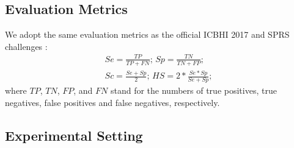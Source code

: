 \documentclass{article}
\begin{document}
\begin{sloppy}
\subsection{Evaluation Metrics}
\label{ssec:eval}

We adopt the same evaluation metrics as the official ICBHI 2017 and SPRS challenges :
\begin{equation}
\label{se}
\begin{split}
    Se=\frac{TP}{TP+FN};\,Sp=\frac{TN}{TN+FP}; \\ Sc=\frac{Se+Sp}{2};\, HS=2*\frac{Se*Sp}{Se+Sp};
\end{split}
\end{equation}
where $TP$, $TN$, $FP$, and $FN$ stand for the numbers of true positives, true negatives, false positives and false negatives, respectively.

\subsection{Experimental Setting}
\label{ssec:exp}


\end{sloppy}
\end{document}
